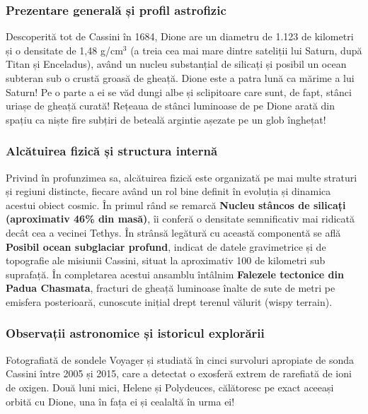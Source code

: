\subsubsection*{Prezentare generală și profil astrofizic}
Descoperită tot de Cassini în 1684, Dione are un diametru de 1.123 de kilometri și o densitate de 1,48 g/cm$^3$ (a treia cea mai mare dintre sateliții lui Saturn, după Titan și Enceladus), având un nucleu substanțial de silicați și posibil un ocean subteran sub o crustă groasă de gheață. Dione este a patra lună ca mărime a lui Saturn! Pe o parte a ei se văd dungi albe și sclipitoare care sunt, de fapt, stânci uriașe de gheață curată! Rețeaua de stânci luminoase de pe Dione arată din spațiu ca niște fire subțiri de beteală argintie așezate pe un glob înghețat!

\subsubsection*{Alcătuirea fizică și structura internă}
Privind în profunzimea sa, alcătuirea fizică este organizată pe mai multe straturi și regiuni distincte, fiecare având un rol bine definit în evoluția și dinamica acestui obiect cosmic. În primul rând se remarcă \textbf{Nucleu stâncos de silicați (aproximativ 46\% din masă)}, îi conferă o densitate semnificativ mai ridicată decât cea a vecinei Tethys. În strânsă legătură cu această componentă se află \textbf{Posibil ocean subglaciar profund}, indicat de datele gravimetrice și de topografie ale misiunii Cassini, situat la aproximativ 100 de kilometri sub suprafață. În completarea acestui ansamblu întâlnim \textbf{Falezele tectonice din Padua Chasmata}, fracturi de gheață luminoase înalte de sute de metri pe emisfera posterioară, cunoscute inițial drept \guillemotleft{}terenul vălurit\guillemotright{} (wispy terrain).

\subsubsection*{Observații astronomice și istoricul explorării}
Fotografiată de sondele Voyager și studiată în cinci survoluri apropiate de sonda Cassini între 2005 și 2015, care a detectat o exosferă extrem de rarefiată de ioni de oxigen. Două luni mici, Helene și Polydeuces, călătoresc pe exact aceeași orbită cu Dione, una în fața ei și cealaltă în urma ei!


